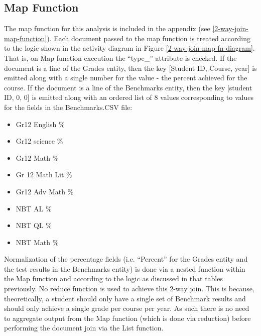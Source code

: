 \subsection{Map Function}
The map function for this analysis is included in the appendix (see \ref{2-way-join-map-function}). Each document passed to the map function is treated according to the logic shown in the activity diagram in Figure \ref{2-way-join-map-fn-diagram}. That is, on Map function execution the ``type\_'' attribute is checked. If the document is a line of the Grades entity, then the key [Student ID, Course, year] is emitted along with a single number for the value - the percent achieved for the course. If the document is a line of the Benchmarks entity, then the key [student ID, 0, 0] is emitted along with an ordered list of 8 values corresponding to values for the fields in the Benchmarks.CSV file:

\begin{itemize}
  \item Gr12 English \%
  \item Gr12 science \%
  \item Gr12 Math \%
  \item Gr 12 Math Lit \%
  \item Gr12 Adv Math \%
  \item NBT AL \%
  \item NBT QL \%
  \item NBT Math \%
\end{itemize}

Normalization of the percentage fields (i.e. ``Percent'' for the Grades entity and the test results in the Benchmarks entity) is done via a nested function within the Map function and according to the logic as discussed in that tables previously. No reduce function is used to achieve this 2-way join. This is because, theoretically, a student should only have a single set of Benchmark results and should only achieve a single grade per course per year. As such there is no need to aggregate output from the Map function (which is done via reduction) before performing the document join via the List function.



